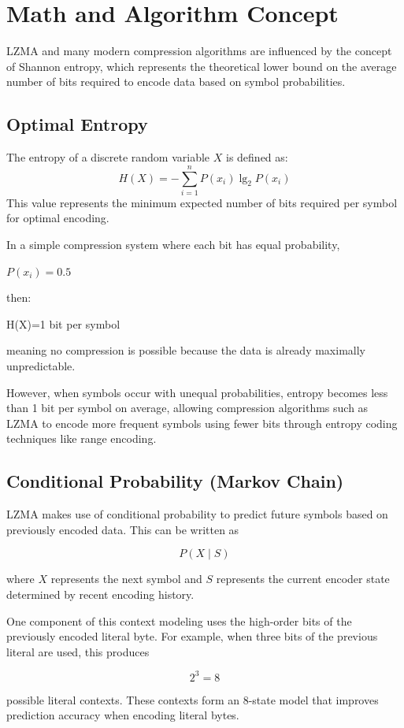 \section{Math and Algorithm Concept}
LZMA and many modern compression algorithms are influenced by the concept of Shannon entropy, which represents the theoretical lower bound on the average number of bits required to encode data based on symbol probabilities.

\subsection{Optimal Entropy}
The entropy of a discrete random variable $X$ is defined as:
\[
H(X) = - \sum_{i=1}^{n}{P(x_i)\lg_2P(x_i)}
\]
This value represents the minimum expected number of bits required per symbol for optimal encoding.

In a simple compression system where each bit has equal probability,

$P(x_i)=0.5$

then:

H(X)=1 bit per symbol

meaning no compression is possible because the data is already maximally unpredictable.

However, when symbols occur with unequal probabilities, entropy becomes less than 1 bit per symbol on average, allowing compression algorithms such as LZMA to encode more frequent symbols using fewer bits through entropy coding techniques like range encoding.

\subsection{Conditional Probability (Markov Chain)}

LZMA makes use of conditional probability to predict future symbols based on previously encoded data. This can be written as

\[
P(X \mid S)
\]

where $X$ represents the next symbol and $S$ represents the current encoder state determined by recent encoding history.

One component of this context modeling uses the high-order bits of the previously encoded literal byte. For example, when three bits of the previous literal are used, this produces

\[
2^3 = 8
\]

possible literal contexts. These contexts form an 8-state model that improves prediction accuracy when encoding literal bytes.

